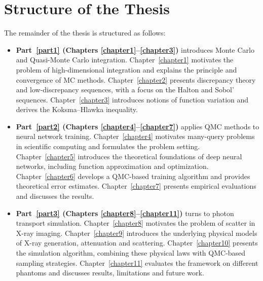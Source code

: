 \section*{Structure of the Thesis}

The remainder of the thesis is structured as follows:

\begin{itemize}
    \item \textbf{Part~\ref{part1} (Chapters \ref{chapter1}--\ref{chapter3})} introduces Monte Carlo and Quasi-Monte Carlo integration. Chapter~\ref{chapter1} motivates the problem of high-dimensional integration and explains the principle and convergence of MC methods. Chapter~\ref{chapter2} presents discrepancy theory and low-discrepancy sequences, with a focus on the Halton and Sobol' sequences. Chapter~\ref{chapter3} introduces notions of function variation and derives the Koksma--Hlawka inequality.
    
    \item \textbf{Part~\ref{part2} (Chapters \ref{chapter4}--\ref{chapter7})} applies QMC methods to neural network training. Chapter~\ref{chapter4} motivates many-query problems in scientific computing and formulates the problem setting. Chapter~\ref{chapter5} introduces the theoretical foundations of deep neural networks, including function approximation and optimization. Chapter~\ref{chapter6} develops a QMC-based training algorithm and provides theoretical error estimates. Chapter~\ref{chapter7} presents empirical evaluations and discusses the results.
    
    \item \textbf{Part~\ref{part3} (Chapters \ref{chapter8}--\ref{chapter11})} turns to photon transport simulation. Chapter~\ref{chapter8} motivates the problem of scatter in X-ray imaging. Chapter~\ref{chapter9} introduces the underlying physical models of X-ray generation, attenuation and scattering. Chapter~\ref{chapter10} presents the simulation algorithm, combining these physical laws with QMC-based sampling strategies. Chapter~\ref{chapter11} evaluates the framework on different phantoms and discusses results, limitations and future work.
\end{itemize}
